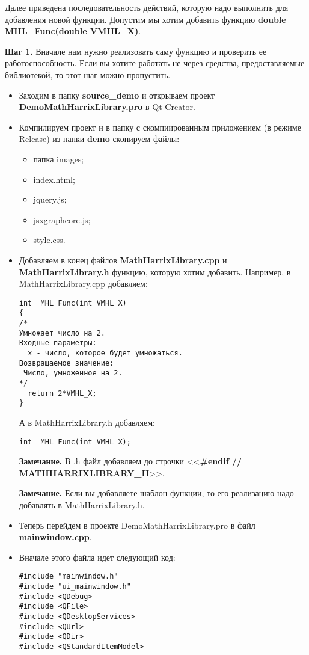 \documentclass[a4paper,12pt]{article}
\begin{document}
Далее приведена последовательность действий, которую надо выполнить для добавления новой функции. Допустим мы хотим добавить функцию  \textbf{double MHL\_Func(double VMHL\_X)}.

\textbf{Шаг 1.}\label{step1} Вначале нам нужно реализовать саму функцию и проверить ее работоспособность. Если вы хотите работать не через средства, предоставляемые библиотекой, то этот шаг можно пропустить.

\begin{itemize}
\item Заходим в папку \textbf{source\_demo} и открываем проект \textbf{DemoMathHarrixLibrary.pro} в Qt Creator.
\item Компилируем проект и в папку с скомпиированным приложением (в режиме Release) из папки \textbf{demo} скопируем файлы:
\begin{itemize}
\item  папка images;
\item  index.html;
\item  jquery.js;
\item  jsxgraphcore.js;
\item  style.css.
\end {itemize}
\item Добавляем в конец файлов \textbf{MathHarrixLibrary.cpp} и \textbf{MathHarrixLibrary.h} функцию, которую хотим добавить. Например, в MathHarrixLibrary.cpp добавляем:
\begin{lstlisting}[label=examplefunction01, caption=Что добавляем в MathHarrixLibrary.cpp]
int  MHL_Func(int VMHL_X)
{
/*
Умножает число на 2.
Входные параметры:
  x - число, которое будет умножаться.
Возвращаемое значение:
 Число, умноженное на 2.
*/
  return 2*VMHL_X;
}
\end{lstlisting}
А в MathHarrixLibrary.h добавляем:
\begin{lstlisting}[label=examplefunction02, caption=Что добавляем в MathHarrixLibrary.h]
int  MHL_Func(int VMHL_X);
\end{lstlisting}
\textbf{Замечание.} В .h файл добавляем до строчки <<\textbf{\#endif // MATHHARRIXLIBRARY\_H}>>.

\textbf{Замечание.} Если вы добавляете шаблон функции, то его реализацию надо добавлять в MathHarrixLibrary.h.
\item Теперь перейдем в проекте DemoMathHarrixLibrary.pro в файл \textbf{mainwindow.cpp}.
\item Вначале этого файла идет следующий код:
\begin{lstlisting}[label=examplefunction03, caption=mainwindow.cpp]
#include "mainwindow.h"
#include "ui_mainwindow.h"
#include <QDebug>
#include <QFile>
#include <QDesktopServices>
#include <QUrl>
#include <QDir>
#include <QStandardItemModel>


\end{lstlisting}
\end{itemize}
\end{document}
